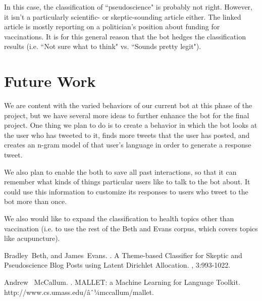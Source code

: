 \documentclass[11pt]{article}
\begin{document}
In this case, the classification of ``pseudoscience" is probably not right. However, it isn't a particularly scientific- or skeptic-sounding article either. The linked article is mostly reporting on a politician's position about funding for vaccinations. It is for this general reason that the bot hedges the classification results (i.e. ``Not sure what to think" vs. ``Sounds pretty legit").

\section{Future Work}
We are content with the varied behaviors of our current bot at this phase of the project, but we have several more ideas to further enhance the bot for the final project. One thing we plan to do is to create a behavior in which the bot looks at the user who has tweeted to it, finds more tweets that the user has posted, and creates an n-gram model of that user's language in order to generate a response tweet. 

We also plan to enable the both to save all past interactions, so that it can remember what kinds of things particular users like to talk to the bot about. It could use this information to customize its responses to users who tweet to the bot more than once. 

We also would like to expand the classification to health topics other than vaccination (i.e. to use the rest of the Beth and Evans corpus, which covers topics like acupuncture).

\begin{thebibliography}{}

Bradley~Beth, and James~Evans.
.
\newblock A Theme-based Classifier for Skeptic and Pseudoscience Blog Posts using Latent Dirichlet Allocation.
, 3:993-1022.


Andrew~ McCallum.
.
\newblock MALLET: a Machine Learning for Language Toolkit.
\newblock http://www.cs.umass.edu/âˆ¼mccallum/mallet.


\end{thebibliography}
\end{document}
